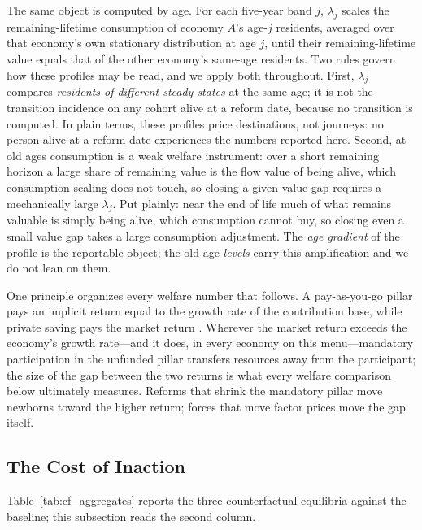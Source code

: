 \documentclass[12pt,a4paper]{article}
\begin{document}
The same object is computed by age. For each five-year band $j$, $\lambda_j$ scales the remaining-lifetime consumption of economy $A$'s age-$j$ residents, averaged over that economy's own stationary distribution at age $j$, until their remaining-lifetime value equals that of the other economy's same-age residents. Two rules govern how these profiles may be read, and we apply both throughout. First, $\lambda_j$ compares \emph{residents of different steady states} at the same age; it is not the transition incidence on any cohort alive at a reform date, because no transition is computed. In plain terms, these profiles price destinations, not journeys: no person alive at a reform date experiences the numbers reported here. Second, at old ages consumption is a weak welfare instrument: over a short remaining horizon a large share of remaining value is the flow value of being alive, which consumption scaling does not touch, so closing a given value gap requires a mechanically large $\lambda_j$. Put plainly: near the end of life much of what remains valuable is simply being alive, which consumption cannot buy, so closing even a small value gap takes a large consumption adjustment. The \emph{age gradient} of the profile is the reportable object; the old-age \emph{levels} carry this amplification and we do not lean on them.

One principle organizes every welfare number that follows. A pay-as-you-go pillar pays an implicit return equal to the growth rate of the contribution base, while private saving pays the market return \citep{Aaron1966}. Wherever the market return exceeds the economy's growth rate---and it does, in every economy on this menu---mandatory participation in the unfunded pillar transfers resources away from the participant; the size of the gap between the two returns is what every welfare comparison below ultimately measures. Reforms that shrink the mandatory pillar move newborns toward the higher return; forces that move factor prices move the gap itself.

\subsection{The Cost of Inaction}
\label{sec:aging}

Table~\ref{tab:cf_aggregates} reports the three counterfactual equilibria against the baseline; this subsection reads the second column.
\end{document}
